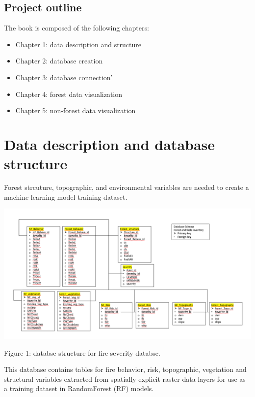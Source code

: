\documentclass[]{book}
\providecommand{\tightlist}{%
  \setlength{\itemsep}{0pt}\setlength{\parskip}{0pt}}
\begin{document}
\hypertarget{project-outline}{%
\section{Project outline}\label{project-outline}}

The book is composed of the following chapters:

\begin{itemize}
\tightlist
\item
  Chapter 1: data description and structure
\item
  Chapter 2: database creation
\item
  Chapter 3: database connection'
\item
  Chapter 4: forest data visualization
\item
  Chapter 5: non-forest data visualization
\end{itemize}

\hypertarget{data}{%
\chapter{Data description and database structure}\label{data}}

Forest strcuture, topographic, and environmental variables are needed to create a machine learning model training dataset.

\begin{center}\includegraphics{db_structure} \end{center}

Figure 1: databse structure for fire severity databse.

This database contains tables for fire behavior, risk, topographic, vegetation and structural variables extracted from spatially explicit raster data layers for use as a training dataset in RandomForest (RF) models.
\end{document}
